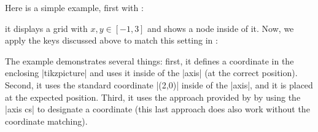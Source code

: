 \noindent Here is a simple example, first with \Tikz{}:
%
\begin{codeexample}[]
\end{codeexample}
%
\noindent it displays a grid with $x,y\in[-1,3]$ and shows a node inside of it.
Now, we apply the keys discussed above to match this setting in \PGFPlots{}:
%
\begin{codeexample}[]
\end{codeexample}
%
\noindent The example demonstrates several things: first, it defines a
coordinate in the enclosing |tikzpicture| and uses it inside of the |axis| (at
the correct position). Second, it uses the standard \Tikz{} coordinate |(2,0)|
inside of the |axis|, and it is placed at the expected position. Third, it uses
the approach provided by \PGFPlots{} by using the |axis cs| to designate a
coordinate (this last approach does also work without the coordinate matching).

